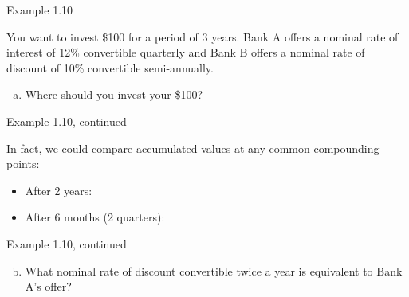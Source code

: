 \documentclass{beamer}
\begin{document}
\begin{frame}{Example 1.10}

You want to invest \$100 for a period of 3 years. Bank A offers a nominal rate of interest of 12\% convertible quarterly and Bank B offers a nominal rate of discount of 10\% convertible semi-annually.

\begin{enumerate}[a)]
\item Where should you invest your \$100?
\end{enumerate}

\vfill
\end{frame}

\begin{frame}{Example 1.10, continued}

In fact, we could compare accumulated values at any common compounding points:
\begin{itemize}
\item After 2 years:
\vspace{4em}
\item After 6 months (2 quarters):
\end{itemize}

\vfill
\end{frame}

\begin{frame}{Example 1.10, continued}

\begin{enumerate}[a)]
\setcounter{enumi}{1}
\item What nominal rate of discount convertible twice a year is equivalent to Bank A's offer?
\end{enumerate}

\vfill
\end{frame}
\end{document}
